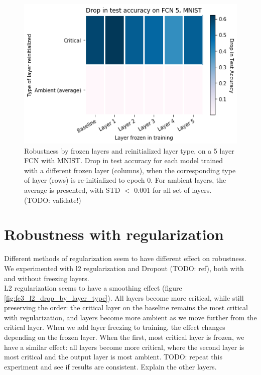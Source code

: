 \documentclass{article}
\begin{document}
\begin{figure}
  \includegraphics[width=\linewidth]{images/fc5_mnist_drop_in_acc_by_layer.png}
  \caption{Robustness by frozen layers and reinitialized layer type, on a 5 layer FCN with MNIST. Drop in test accuracy for each model trained with a different frozen layer (columns), when the corresponding type of layer (rows) is re-initialized to epoch 0. For ambient layers, the average is presented, with STD $<$ 0.001 for all set of layers. (TODO: validate!)}
  \label{fig:fc5_drop_by_layer_type}
\end{figure}
\section{Robustness with regularization}
Different methods of regularization seem to have different effect on robustness. We experimented with l2 regularization and Dropout (TODO: ref), both with and without freezing layers.\\
L2 regularization seems to have a smoothing effect (figure \ref{fig:fc3_l2_drop_by_layer_type}). All layers become more critical, while still preserving the order: the critical layer on the baseline remains the most critical with regularization, and layers become more ambient as we move further from the critical layer. When we add layer freezing to training, the effect changes depending on the frozen layer. When the first, most critical layer is frozen, we have a similar effect: all layers become more critical, where the second layer is most critical and the output layer is most ambient. TODO: repeat this experiment and see if results are consistent. Explain the other layers.\\
\end{document}

